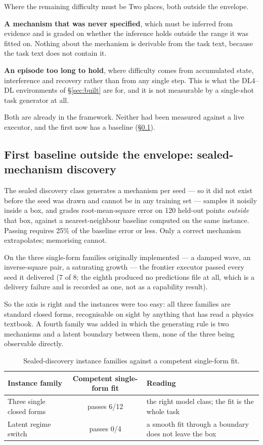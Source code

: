 \begin{cautionbox}{Where the remaining difficulty must be}
Two places, both outside the envelope.

\textbf{A mechanism that was never specified}, which must be inferred from evidence and is graded on whether the inference holds outside the range it was fitted on. Nothing about the mechanism is derivable from the task text, because the task text does not contain it.

\textbf{An episode too long to hold}, where difficulty comes from accumulated state, interference and recovery rather than from any single step. This is what the DL4--DL\Om{} environments of \S\ref{sec:built} are for, and it is not measurable by a single-shot task generator at all.

Both are already in the framework. Neither had been measured against a live executor, and the first now has a baseline (\S\ref{sec:discovery}).
\end{cautionbox}

\subsection{First baseline outside the envelope: sealed-mechanism discovery}\label{sec:discovery}

The sealed discovery class generates a mechanism per seed --- so it did not exist before the seed was drawn and cannot be in any training set --- samples it noisily inside a box, and grades root-mean-square error on 120 held-out points \emph{outside} that box, against a nearest-neighbour baseline computed on the same instance. Passing requires 25\% of the baseline error or less. Only a correct mechanism extrapolates; memorising cannot.

On the three single-form families originally implemented --- a damped wave, an inverse-square pair, a saturating growth --- the frontier executor passed every seed it delivered (7 of 8; the eighth produced no predictions file at all, which is a delivery failure and is recorded as one, not as a capability result).

So the axis is right and the instances were too easy: all three families are standard closed forms, recognisable on sight by anything that has read a physics textbook. A fourth family was added in which the generating rule is two mechanisms and a latent boundary between them, none of the three being observable directly.

\begin{table}[!htbp]
\centering\small
\begin{tabularx}{\textwidth}{@{}lcY@{}}
\toprule
Instance family & Competent single-form fit & Reading \\
\midrule
Three single closed forms & passes 6/12 & the right model class; the fit is the whole task \\
Latent regime switch & passes 0/4 & a smooth fit through a boundary does not leave the box \\
\bottomrule
\end{tabularx}
\caption{Sealed-discovery instance families against a competent single-form fit.}
\label{tab:sealedfamilies}
\end{table}

